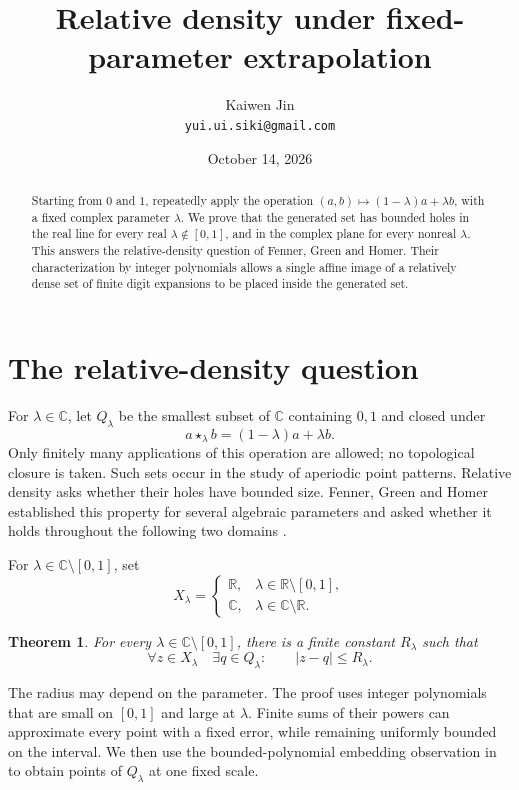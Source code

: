 \documentclass[11pt]{article}
\title{Relative density under fixed-parameter extrapolation}
\author{Kaiwen Jin\\\small\texttt{yui.ui.siki@gmail.com}}
\date{October 14, 2026}
\newtheorem{theorem}{Theorem}
\newcommand{\C}{\mathbb C}
\newcommand{\R}{\mathbb R}
\begin{document}
\maketitle

\begin{abstract}
Starting from $0$ and $1$, repeatedly apply the operation
$(a,b)\mapsto(1-\lambda)a+\lambda b$, with a fixed complex parameter
$\lambda$. We prove that the generated set has bounded holes in the real
line for every real $\lambda\notin[0,1]$, and in the complex plane for every
nonreal $\lambda$. This answers the relative-density question of Fenner,
Green and Homer. Their characterization by integer polynomials allows a
single affine image of a relatively dense set of finite digit expansions
to be placed inside the generated set.
\end{abstract}

\section{The relative-density question}

For $\lambda\in\C$, let $Q_\lambda$ be the smallest subset of $\C$
containing $0,1$ and closed under
\[
 a\star_\lambda b=(1-\lambda)a+\lambda b.
\]
Only finitely many applications of this operation are allowed; no
topological closure is taken. Such sets occur in the study of aperiodic
point patterns. Relative density asks whether their holes have bounded size.
Fenner, Green and Homer established this property for several algebraic
parameters and asked whether it holds throughout the following two domains
\cite[Section~6 and Open Question~11.3]{FGH}.

For $\lambda\in\C\setminus[0,1]$, set
\[
 X_\lambda=
 \begin{cases}
  \R,&\lambda\in\R\setminus[0,1],\\
  \C,&\lambda\in\C\setminus\R.
 \end{cases}
\]

\begin{theorem}\label{thm:main}
For every $\lambda\in\C\setminus[0,1]$, there is a finite constant
$R_\lambda$ such that
\[
 \forall z\in X_\lambda\quad\exists q\in Q_\lambda:
 \qquad |z-q|\le R_\lambda.
\]
\end{theorem}

The radius may depend on the parameter. The proof uses integer polynomials
that are small on $[0,1]$ and large at $\lambda$. Finite sums of their powers
can approximate every point with a fixed error, while remaining uniformly
bounded on the interval. We then use the bounded-polynomial embedding
observation in \cite[Lemma~6.19 and the following remark]{FGH} to obtain
points of $Q_\lambda$ at one fixed scale.
\end{document}
